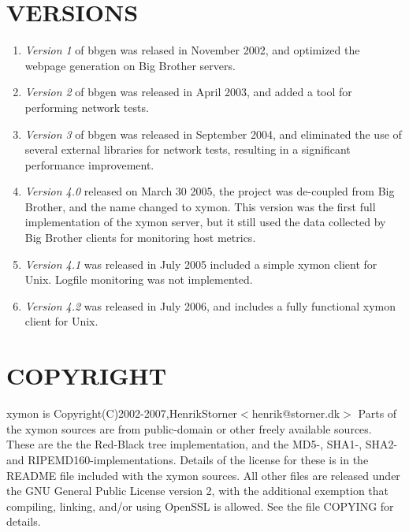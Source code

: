 \section{VERSIONS}

\begin{enumerate}

 \item \emph{Version 1} of bbgen was relased in November 2002, and optimized the
 webpage generation on Big Brother servers. 

 \item \emph{Version 2} of bbgen was released in April 2003, and added a tool for performing network tests. 

 \item \emph{Version 3} of bbgen was released in September 2004, and eliminated
 the use of several external libraries for network tests, resulting
 in a significant performance improvement. 

 \item \emph{Version 4.0 }released on March 30 2005, the project was
 de-coupled from Big Brother, and the name changed to xymon. This
 version was the first full implementation of the xymon server, but
 it still used the data collected by Big Brother clients for
 monitoring host metrics. 

 \item \emph{Version 4.1} was released in July 2005 included a simple xymon client for Unix. Logfile monitoring was not implemented. 


 \item \emph{Version 4.2} was released in July 2006, and includes a fully functional xymon client for Unix. 

\end{enumerate}
 
 
\section{COPYRIGHT}

xymon is Copyright(C)2002-2007,HenrikStorner$<$henrik@storner.dk$>$   
Parts of the xymon sources are from public-domain or other freely available
sources. These are the the Red-Black tree implementation, and the
MD5-, SHA1-, SHA2- and RIPEMD160-implementations. Details of the
license for these is in the README file included with the xymon
sources. All other files are released under the GNU General Public
License version 2, with the additional exemption that compiling,
linking, and/or using OpenSSL is allowed. See the file COPYING for
details. 


